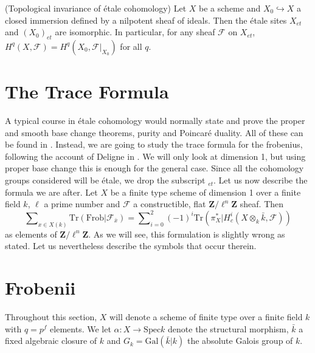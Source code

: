 \begin{proposition}
\label{proposition-topological-invariance}
(Topological invariance of \'etale cohomology)
Let $X$ be a scheme and $X_0\hookrightarrow X$ a closed immersion defined by a
nilpotent sheaf of ideals. Then the \'etale sites $X_{et}$ and $(X_0)_{et}$ are
isomorphic. In particular, for any sheaf $\mathcal{F}$ on $X_{et}$, $H^q(X,
\mathcal{F}) = H^q(X_0, \mathcal{F}|_{X_0})$ for all $q$.
\end{proposition}




\section{The Trace Formula}
\label{section-trace-formula}

\noindent
A typical course in \'etale cohomology would normally state and prove the
proper and smooth base change theorems, purity and Poincar\'e duality. All of
these can be found in \cite[Arcata]{SGA4.5}. Instead, we are going to study the
trace formula for the frobenius, following the account of Deligne in
\cite[Rapport]{SGA4.5}. We will only look at dimension 1, but using proper base
change this is enough for the general case. Since all the cohomology groups
considered will be \'etale, we drop the subscript $_{et}$. Let us now describe
the formula we are after. Let $X$ be a finite type scheme of dimension 1 over a
finite field $k$, $\ell$ a prime number and $\mathcal{F}$ a constructible, flat
$\mathbf{Z}/\ell^n\mathbf{Z}$ sheaf. Then
\begin{equation}
\label{equation-trace-formula-initial}
\sum\nolimits_{x \in X(k)}
\text{Tr}(\text{Frob} | \mathcal{F}_{\bar x}) =
\sum\nolimits_{i=0}^2
(-1)^i \text{Tr}(\pi_X^* | H^i_c(X\otimes_k \bar k, \mathcal{F}))
\end{equation}
as elements of $\mathbf{Z}/\ell^n\mathbf{Z}$. As we will see, this formulation
is slightly wrong as stated. Let us nevertheless describe the symbols that
occur therein.




\section{Frobenii}
\label{section-frobenii}

\noindent
Throughout this section, $X$ will denote a scheme of finite type over a finite
field $k$ with $q = p^f$ elements. We let $\alpha : X \to \text{Spec} k$ denote
the structural morphism, $\bar k$ a fixed algebraic closure of $k$ and $G_k =
\text{Gal}(\bar k | k)$ the absolute Galois group of $k$.

